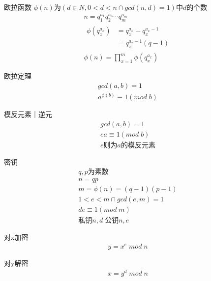 \documentclass{article}
\begin{document}
欧拉函数 \(\phi(n)\)为\((d \in N , 0<d<n \cap gcd(n,d)=1)\)中\(d\)的个数
\begin{gather*}
  n = q_1^{a_1}q_2^{a_3} \cdots q_m^{a_m} \\
  \begin{aligned}
  \phi(q_x^{a_x}) &= q_x^{a_x} - q_x^{a_x - 1} \\
  &= q_x^{a_x-1}(q - 1)
  \end{aligned} \\
  \phi(n) = \prod_{x=1}^{m} \phi(q_x^{a_x})
\end{gather*}

欧拉定理
\begin{gather*}
  gcd(a,b) = 1 \\
  a^{\phi(b)} \equiv 1 (mod\; b)
\end{gather*}

模反元素｜逆元
\begin{gather*}
  gcd(a,b) = 1 \\
  ea \equiv 1 (mod\; b) \\
  e\text{则为}a\text{的模反元素}
\end{gather*}

密钥
\begin{gather*}
  q,p\text{为素数} \\
  n = qp \\
  m = \phi(n) = (q-1)(p-1) \\
  1<e<m \cap gcd(e,m) = 1 \\
  de \equiv 1 (mod\; m) \\
  \text{私钥}n,d \; \text{公钥}n,e
\end{gather*}

对x加密
\begin{gather*}
  y = x^e \; mod \; n
\end{gather*}

对y解密
\begin{gather*}
  x = y^d \; mod \; n
\end{gather*}
\end{document}
